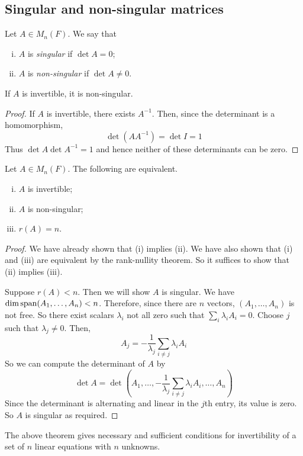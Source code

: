 \subsection{Singular and non-singular matrices}
\begin{definition}
	Let \( A \in M_n(F) \).
	We say that
	\begin{enumerate}[(i)]
		\item \( A \) is \textit{singular} if \( \det A = 0 \);
		\item \( A \) is \textit{non-singular} if \( \det A \neq 0 \).
	\end{enumerate}
\end{definition}
\begin{lemma}
	If \( A \) is invertible, it is non-singular.
\end{lemma}
\begin{proof}
	If \( A \) is invertible, there exists \( A^{-1} \).
	Then, since the determinant is a homomorphism,
	\[
		\det(A A^{-1}) = \det I = 1
	\]
	Thus \( \det A \det A^{-1} = 1 \) and hence neither of these determinants can be zero.
\end{proof}
\begin{theorem}
	Let \( A \in M_n(F) \).
	The following are equivalent.
	\begin{enumerate}[(i)]
		\item \( A \) is invertible;
		\item \( A \) is non-singular;
		\item \( r(A) = n \).
	\end{enumerate}
\end{theorem}
\begin{proof}
	We have already shown that (i) implies (ii).
	We have also shown that (i) and (iii) are equivalent by the rank-nullity theorem.
	So it suffices to show that (ii) implies (iii).

	Suppose \( r(A) < n \).
	Then we will show \( A \) is singular.
	We have \( \dim \operatorname{span}(A_1, \dots, A_n) < n \).
	Therefore, since there are \( n \) vectors, \( (A_1, \dots, A_n) \) is not free.
	So there exist scalars \( \lambda_i \) not all zero such that \( \sum_i \lambda_i A_i = 0 \).
	Choose \( j \) such that \( \lambda_j \neq 0 \).
	Then,
	\[
		A_j = -\frac{1}{\lambda_j} \sum_{i \neq j} \lambda_i A_i
	\]
	So we can compute the determinant of \( A \) by
	\[
		\det A = \det(A_1, \dots, -\frac{1}{\lambda_j} \sum_{i \neq j} \lambda_i A_i, \dots, A_n)
	\]
	Since the determinant is alternating and linear in the \( j \)th entry, its value is zero.
	So \( A \) is singular as required.
\end{proof}
\begin{remark}
	The above theorem gives necessary and sufficient conditions for invertibility of a set of \( n \) linear equations with \( n \) unknowns.
\end{remark}

